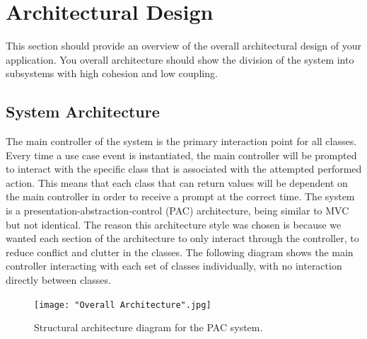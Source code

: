 \documentclass[12pt, titlepage]{article}
\begin{document}
\section{Architectural Design}
\label{sec:architectural_design}
This section should provide an overview of the overall architectural design of your application. You overall architecture should show the division of the system into subsystems with high cohesion and low coupling.

\subsection{System Architecture}
\label{sub:system_architecture}
The main controller of the system is the primary interaction point for all classes. Every time a use case event is instantiated, the main controller will be prompted to interact with the specific class that is associated with the attempted performed action. This means that each class that can return values will be dependent on the main controller in order to receive a prompt at the correct time. The system is a presentation-abstraction-control (PAC) architecture, being similar to MVC but not identical. The reason this architecture style was chosen is because we wanted each section of the architecture to only interact through the controller, to reduce conflict and clutter in the classes. The following diagram shows the main controller interacting with each set of classes individually, with no interaction directly between classes.

\begin{figure}[h!]
  \centering
  \texttt{[image: "Overall Architecture".jpg]}
  \caption{Structural architecture diagram for the PAC system.}
\end{figure}
\end{document}
